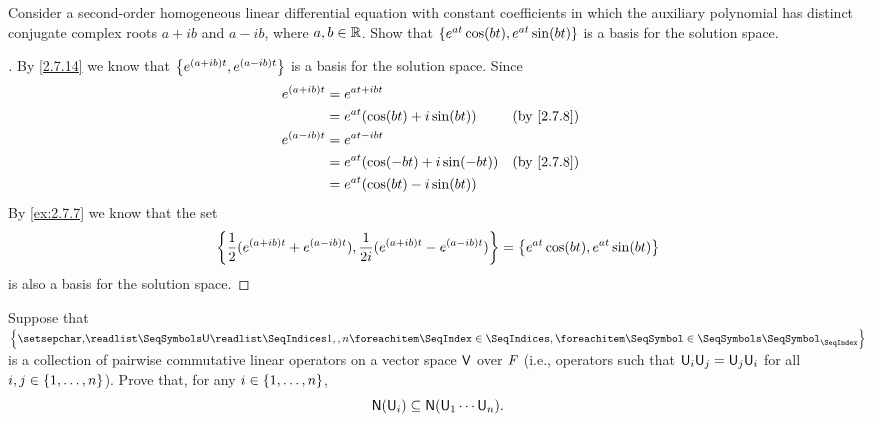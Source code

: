 \begin{ex}\label{ex:2.7.8}
  Consider a second-order homogeneous linear differential equation with constant coefficients in which the auxiliary polynomial has distinct conjugate complex roots \(a + ib\) and \(a - ib\), where \(a, b \in \mathbb{R}\).
  Show that \(\left\lbrace e^{at} \cos(bt), e^{at} \sin(bt)\right\rbrace\) is a basis for the solution space.
\end{ex}

\begin{proof}[]
  By \cref{2.7.14} we know that \(\left\lbrace e^{(a + ib) t}, e^{(a - ib) t}\right\rbrace\) is a basis for the solution space.
  Since
  \begin{align*}
    e^{(a + ib) t} & = e^{at + ibt}                                                   \\
                   & = e^{at} (\cos(bt) + i \sin(bt))   &  & \text{(by \cref{2.7.8})} \\
    e^{(a - ib) t} & = e^{at - ibt}                                                   \\
                   & = e^{at} (\cos(-bt) + i \sin(-bt)) &  & \text{(by \cref{2.7.8})} \\
                   & = e^{at} (\cos(bt) - i \sin(bt))
  \end{align*}
  By \cref{ex:2.7.7} we know that the set
  \[
    \left\lbrace\frac{1}{2} (e^{(a + ib) t} + e^{(a - ib) t}), \frac{1}{2i} (e^{(a + ib) t} - e^{(a - ib) t})\right\rbrace = \left\lbrace e^{at} \cos(bt), e^{at} \sin(bt)\right\rbrace
  \]
  is also a basis for the solution space.
\end{proof}

\begin{ex}\label{ex:2.7.9}
  Suppose that \(\set{\seq{\U}{1,,n}}\) is a collection of pairwise commutative linear operators on a vector space \(\mathsf{V}\) over \(\mathit{F}\)
  (i.e., operators such that \(\mathsf{U}_i \mathsf{U}_j = \mathsf{U}_j \mathsf{U}_i\) for all \(i, j \in \left\lbrace1, \dots, n\right\rbrace\)).
  Prove that, for any \(i \in \left\lbrace1, \dots, n\right\rbrace\),
  \[
    \ns{\U_i} \subseteq \ns{\U_1 \cdots \U_n}.
  \]
\end{ex}

